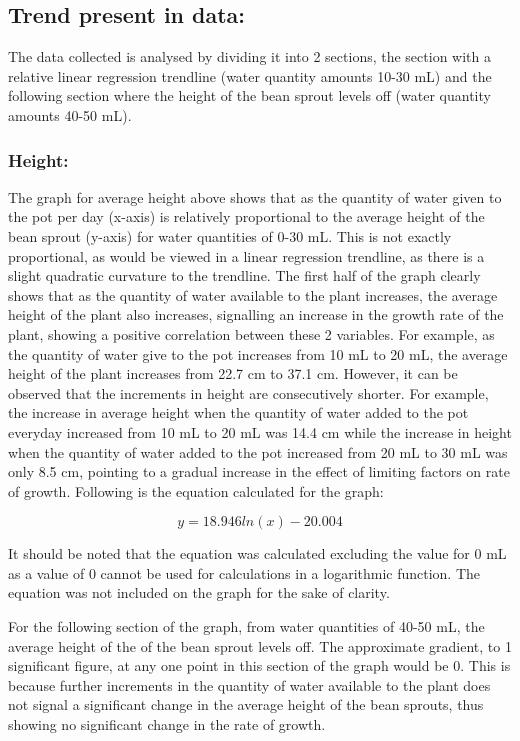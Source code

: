 \documentclass[11pt, a4]{article}
\begin{document}
		\subsection{Trend present in data:}
		The data collected is analysed by dividing it into 2 sections, the section with a relative linear regression trendline (water quantity amounts 10-30 mL) and the following section where the height of the bean sprout levels off (water quantity amounts 40-50 mL). 
			\subsubsection{Height:}
				The graph for average height above shows that as the quantity of water given to the pot per day (x-axis) is relatively proportional to the average height of the bean sprout (y-axis) for water quantities of 0-30 mL. This is not exactly proportional, as would be viewed in a linear regression trendline, as there is a slight quadratic curvature to the trendline. The first half of the graph clearly shows that as the quantity of water available to the plant increases, the average height of the plant also increases, signalling an increase in the growth rate of the plant, showing a positive correlation between these 2 variables. For example, as the quantity of water give to the pot increases from 10 mL to 20 mL, the average height of the plant increases from 22.7 cm to 37.1 cm. However, it can be observed that the increments in height are consecutively shorter. For example, the increase in average height when the quantity of water added to the pot everyday increased from 10 mL to 20 mL was 14.4 cm while the increase in height when the quantity of water added to the pot increased from 20 mL to 30 mL was only 8.5 cm, pointing to a gradual increase in the effect of limiting factors on rate of growth. Following is the equation calculated for the graph:

				\begin{equation}
					y = 18.946ln(x) - 20.004
				\end{equation}

				It should be noted that the equation was calculated excluding the value for 0 mL as a value of 0 cannot be used for calculations in a logarithmic function. The equation was not included on the graph for the sake of clarity.

				\bigbreak

				For the following section of the graph, from water quantities of 40-50 mL, the average height of the of the bean sprout levels off. The approximate gradient, to 1 significant figure, at any one point in this section of the graph would be 0. This is because further increments in the quantity of water available to the plant does not signal a significant change in the average height of the bean sprouts, thus showing no significant change in the rate of growth.
\end{document}
